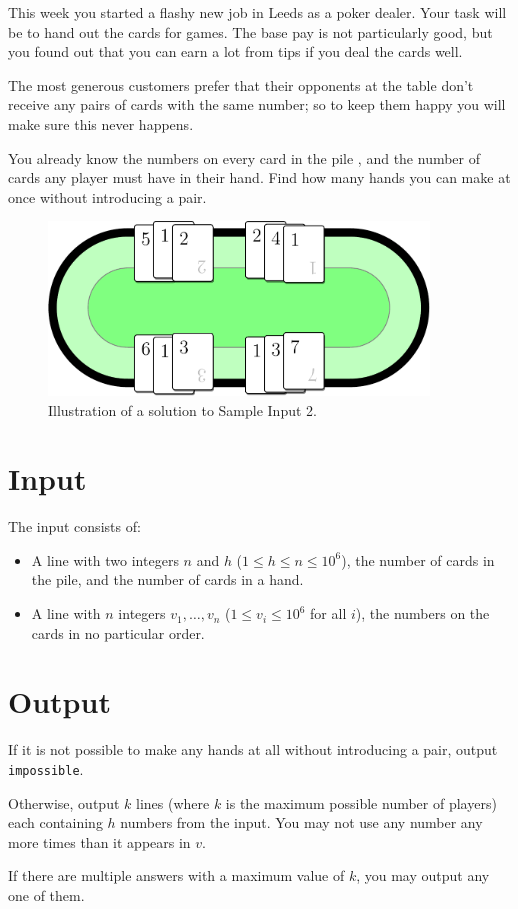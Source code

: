 
This week you started a flashy new job in Leeds as a poker dealer. Your task
will be to hand out the cards for games. The base pay is not particularly good,
but you found out that you can earn a lot from tips if you deal the cards well.

The most generous customers prefer that their opponents at the table don't
receive any pairs of cards with the same number; so to keep them happy you will
make sure this never happens.

You already know the numbers on every card in the pile , and the number of
cards any player must have in their hand. Find how many hands you can make at
once without introducing a pair.

\begin{figure}[h!]
  \centering
  \includegraphics[width=0.9\textwidth]{sample}
  \caption{Illustration of a solution to Sample Input 2.}
  \label{fig:crookeddealing}
\end{figure}

\section*{Input}
The input consists of:
  \begin{itemize}
    \item A line with two integers $n$ and $h$ ($1 \le h \le n \le 10^6$), the
          number of cards in the pile, and the number of cards in a hand.
    \item A line with $n$ integers $v_1, \ldots, v_n$ ($1 \le v_i \le 10^6$
          for all $i$), the numbers on the cards in no particular order.
  \end{itemize}

\section*{Output}
  If it is not possible to make any hands at all without introducing a pair,
  output \texttt{impossible}.

  Otherwise, output $k$ lines (where $k$ is the maximum possible number of
  players) each containing $h$ numbers from the input. You may not use any
  number any more times than it appears in $v$.

  If there are multiple answers with a maximum value of $k$, you may output any
  one of them.
